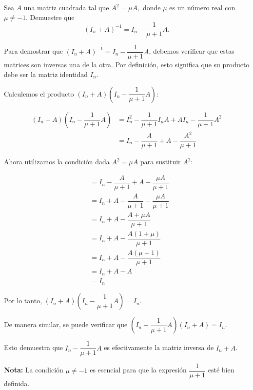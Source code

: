 \begin{prob} 
Sea $A$ una matriz cuadrada tal que $A^{2}=\mu A,$ donde $\mu$ es un número real con $\mu \neq -1.$ Demuestre que 
$$\left( I_{n}+A \right)^{-1}=I_{n}-\dfrac{1}{\mu +1}A.$$

\begin{myproof} 
Para demostrar que $\left( I_{n}+A \right)^{-1}=I_{n}-\dfrac{1}{\mu +1}A$, debemos verificar que estas matrices son inversas una de la otra. Por definición, esto significa que su producto debe ser la matriz identidad $I_{n}$.

Calculemos el producto $\left( I_{n}+A \right)\left( I_{n}-\dfrac{1}{\mu +1}A\right)$:

\begin{align*}
\left( I_{n}+A \right)\left( I_{n}-\dfrac{1}{\mu +1}A\right) &= I_{n}^{2} - \dfrac{1}{\mu +1}I_{n}A + AI_{n} - \dfrac{1}{\mu +1}A^2\\
&= I_{n} - \dfrac{A}{\mu +1} + A - \dfrac{A^2}{\mu +1}
\end{align*}

Ahora utilizamos la condición dada $A^{2} = \mu A$ para sustituir $A^2$:

\begin{align*}
&= I_{n} - \dfrac{A}{\mu +1} + A - \dfrac{\mu A}{\mu +1}\\
&= I_{n} + A - \dfrac{A}{\mu +1} - \dfrac{\mu A}{\mu +1}\\
&= I_{n} + A - \dfrac{A + \mu A}{\mu +1}\\
&= I_{n} + A - \dfrac{A(1 + \mu)}{\mu +1}\\
&= I_{n} + A - \dfrac{A(\mu + 1)}{\mu +1}\\
&= I_{n} + A - A\\
&= I_{n}
\end{align*}

Por lo tanto, $\left( I_{n}+A \right)\left( I_{n}-\dfrac{1}{\mu +1}A\right) = I_{n}$.

De manera similar, se puede verificar que $\left( I_{n}-\dfrac{1}{\mu +1}A\right)\left( I_{n}+A \right) = I_{n}$.

Esto demuestra que $I_{n}-\dfrac{1}{\mu +1}A$ es efectivamente la matriz inversa de $I_{n}+A$.

\textbf{Nota:} La condición $\mu \neq -1$ es esencial para que la expresión $\dfrac{1}{\mu +1}$ esté bien definida.

\end{myproof}
\end{prob}


